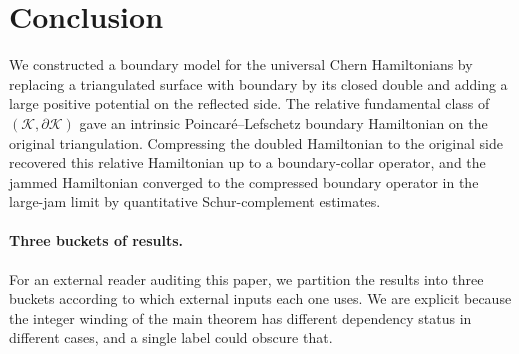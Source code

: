 \documentclass[11pt]{article}
\numberwithin{equation}{section}
\theoremstyle{definition}
\theoremstyle{remark}
\newcommand{\K}{\mathcal{K}}
\newcommand{\bd}{\partial}
\begin{document}
\section{Conclusion}

We constructed a boundary model for the universal Chern Hamiltonians by replacing a triangulated
surface with boundary by its closed double and adding a large positive potential on the reflected
side. The relative fundamental class of \((\K,\bd\K)\) gave an intrinsic Poincar\'e--Lefschetz
boundary Hamiltonian on the original triangulation. Compressing the doubled Hamiltonian to the
original side recovered this relative Hamiltonian up to a boundary-collar operator, and the
jammed Hamiltonian converged to the compressed boundary operator in the large-jam limit by
quantitative Schur-complement estimates.

\paragraph{Three buckets of results.} For an external reader auditing this paper, we partition
the results into three buckets according to which external inputs each one uses. We are explicit
because the integer winding of the main theorem has different dependency status in different cases, and a
single label could obscure that.
\end{document}

